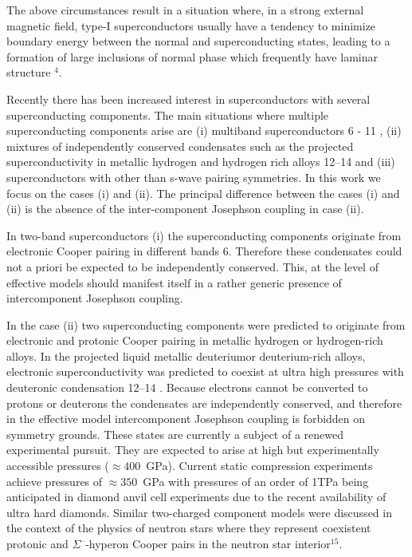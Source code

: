 The above circumstances result in a situation where, in a strong external 
magnetic field, type-I superconductors usually have a tendency to minimize 
boundary energy between the normal and superconducting states, leading to a 
formation of large inclusions of normal phase which frequently have laminar 
structure \( ^4 \). 

Recently there has been increased interest in superconductors with several 
superconducting components. The main situations where multiple superconducting 
components arise are (i) multiband superconductors 6 - 11 , (ii) mixtures of 
independently conserved condensates such as the projected superconductivity 
in metallic hydrogen and hydrogen rich alloys 12–14 and (iii) superconductors 
with other than s-wave pairing symmetries. In this work we focus on the cases 
(i) and (ii). The principal difference between the cases (i) and (ii) is the 
absence of the inter-component Josephson coupling in case (ii). 

In two-band superconductors (i) the superconducting components originate from 
electronic Cooper pairing in different bands 6. Therefore these condensates 
could not a priori be expected to be independently conserved. This, at the 
level of effective models should manifest itself in a rather generic presence 
of intercomponent Josephson coupling. 

In the case (ii) two superconducting components were predicted to originate 
from electronic and protonic Cooper pairing in metallic hydrogen or 
hydrogen-rich alloys. In the projected liquid metallic deuteriumor 
deuterium-rich alloys, electronic superconductivity was predicted to coexist 
at ultra high pressures with deuteronic condensation 12–14 . Because electrons 
cannot be converted to protons or deuterons the condensates are independently 
conserved, and therefore in the effective model intercomponent Josephson 
coupling is forbidden on symmetry grounds. These states are currently a 
subject of a renewed experimental pursuit. They are expected to arise at high 
but experimentally accessible pressures (\( \approx 400 \)~GPa). Current 
static compression experiments achieve pressures of \( \approx 350 \)~GPa 
with pressures of an order of 1TPa being anticipated in diamond anvil cell 
experiments due to the recent availability of ultra hard diamonds. Similar 
two-charged component models were discussed in the context of the physics of 
neutron stars where they represent coexistent protonic and 
\( \Sigma^\text{--} \)-hyperon Cooper pairs in the neutron star 
interior\( ^{15} \). 

